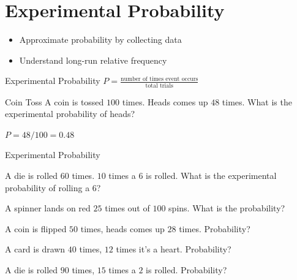 \section{Experimental Probability}

\begin{learningGoals}
\begin{itemize}
    \item Approximate probability by collecting data
    \item Understand long-run relative frequency
\end{itemize}
\end{learningGoals}

\begin{conceptBox}{Experimental Probability}
$P = \frac{\text{number of times event occurs}}{\text{total trials}}$
\end{conceptBox}

\begin{workedExample}{Coin Toss}
A coin is tossed $100$ times. Heads comes up $48$ times. What is the experimental probability of heads?

$P = 48/100 = 0.48$
\end{workedExample}


\begin{practiceBox}{Experimental Probability}
\resetProblems

\prob A die is rolled $60$ times. $10$ times a $6$ is rolled. What is the experimental probability of rolling a $6$?

\prob A spinner lands on red $25$ times out of $100$ spins. What is the probability?

\prob A coin is flipped $50$ times, heads comes up $28$ times. Probability?

\prob A card is drawn $40$ times, $12$ times it's a heart. Probability?

\prob A die is rolled $90$ times, $15$ times a $2$ is rolled. Probability?

\end{practiceBox}
